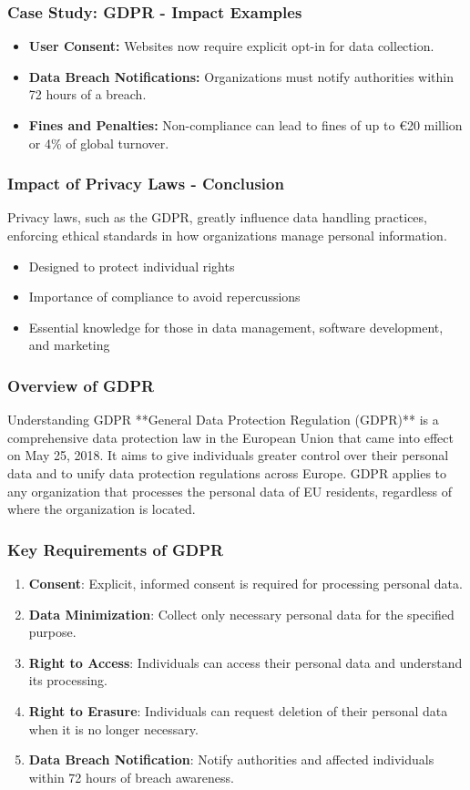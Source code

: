 \documentclass[aspectratio=169]{beamer}
\begin{document}
\begin{frame}[fragile]
    \frametitle{Case Study: GDPR - Impact Examples}
    \begin{itemize}
        \item \textbf{User Consent:} Websites now require explicit opt-in for data collection.
        \item \textbf{Data Breach Notifications:} Organizations must notify authorities within 72 hours of a breach.
        \item \textbf{Fines and Penalties:} Non-compliance can lead to fines of up to €20 million or 4\% of global turnover.
    \end{itemize}
\end{frame}

\begin{frame}[fragile]
    \frametitle{Impact of Privacy Laws - Conclusion}
    Privacy laws, such as the GDPR, greatly influence data handling practices, enforcing ethical standards in how organizations manage personal information.
    \begin{itemize}
        \item Designed to protect individual rights
        \item Importance of compliance to avoid repercussions
        \item Essential knowledge for those in data management, software development, and marketing
    \end{itemize}
\end{frame}

\begin{frame}[fragile]
  \frametitle{Overview of GDPR}
  \begin{block}{Understanding GDPR}
    **General Data Protection Regulation (GDPR)** is a comprehensive data protection law in the European Union that came into effect on May 25, 2018. It aims to give individuals greater control over their personal data and to unify data protection regulations across Europe. GDPR applies to any organization that processes the personal data of EU residents, regardless of where the organization is located.
  \end{block}
\end{frame}

\begin{frame}[fragile]
  \frametitle{Key Requirements of GDPR}
  \begin{enumerate}
    \item \textbf{Consent}: Explicit, informed consent is required for processing personal data.
    \item \textbf{Data Minimization}: Collect only necessary personal data for the specified purpose.
    \item \textbf{Right to Access}: Individuals can access their personal data and understand its processing.
    \item \textbf{Right to Erasure}: Individuals can request deletion of their personal data when it is no longer necessary.
    \item \textbf{Data Breach Notification}: Notify authorities and affected individuals within 72 hours of breach awareness.
  \end{enumerate}
\end{frame}
\end{document}
